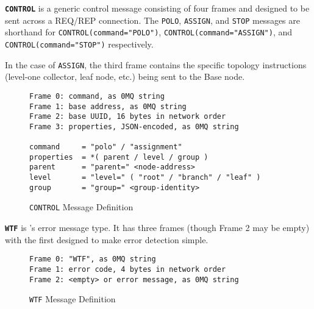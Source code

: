 \textbf{\texttt{CONTROL}} is a generic control message consisting of four frames and designed to be sent across a
REQ/REP connection. The \texttt{POLO}, \texttt{ASSIGN}, and \texttt{STOP} messages are shorthand for
\texttt{CONTROL(command="POLO")}, \texttt{CONTROL(command="ASSIGN")}, and \texttt{CONTROL(command="STOP")} respectively.

In the case of \texttt{ASSIGN}, the third frame contains the specific topology instructions (level-one collector, leaf
node, etc.) being sent to the Base node.

\begin{figure}[H]
\vspace{+10pt}
\begin{verbatim}
Frame 0: command, as 0MQ string
Frame 1: base address, as 0MQ string
Frame 2: base UUID, 16 bytes in network order
Frame 3: properties, JSON-encoded, as 0MQ string

command     = "polo" / "assignment"
properties  = *( parent / level / group )
parent      = "parent=" <node-address>
level       = "level=" ( "root" / "branch" / "leaf" )
group       = "group=" <group-identity>
\end{verbatim}
\vspace{-20pt}
\caption{\texttt{CONTROL} Message Definition}
\label{fig:message_control}
\end{figure}

\textbf{\texttt{WTF}} is \dcamp's error message type. It has three frames (though Frame 2 may be empty) with the first
designed to make error detection simple.

\begin{figure}[H]
\vspace{+10pt}
\begin{verbatim}
Frame 0: "WTF", as 0MQ string
Frame 1: error code, 4 bytes in network order
Frame 2: <empty> or error message, as 0MQ string
\end{verbatim}
\vspace{-20pt}
\caption{\texttt{WTF} Message Definition}
\label{fig:message_wtf}
\end{figure}
